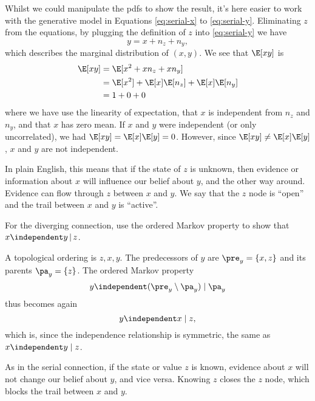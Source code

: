 \begin{exenumerate}
\begin{solution}
       Whilst we could manipulate the pdfs to show the result, it's
       here easier to work with the generative model in Equations
       \eqref{eq:serial-x} to \eqref{eq:serial-y}. Eliminating $z$
       from the equations, by plugging the definition of $z$ into
       \eqref{eq:serial-y} we have
       \begin{equation}
         y = x + n_z + n_y,
       \end{equation}
       which describes the marginal distribution of $(x, y)$. We see
       that $\E[xy]$ is
       \begin{align}
         \E[xy] & = \E[x^2 + xn_z + x n_y]\\
         & =  \E[x^2] + \E[x]\E[n_z] + \E[x]\E[n_y]\\
         & = 1 + 0 + 0
       \end{align}
       where we have use the linearity of expectation, that $x$ is
       independent from $n_z$ and $n_y$, and that $x$ has zero
       mean. If $x$ and $y$ were independent (or only uncorrelated),
       we had $\E[xy] = \E[x]\E[y] = 0$. However, since $\E[xy] \neq \E[x]
       \E[y]$, $x$ and $y$ are not independent.

       In plain English, this means that if the state of $z$ is
       unknown, then evidence or information about $x$ will influence
       our belief about $y$, and the other way around. Evidence can
       flow through $z$ between $x$ and $y$. We say that the $z$ node
       is ``open'' and the trail between $x$ and $y$ is ``active''.
       
     \end{solution}
 \item For the diverging connection, use the ordered Markov property
   to show that $x \independent y \,|\, z$.
    \begin{solution}
     A topological ordering is $z, x, y$. The predecessors of
     $y$ are $\pre_y = \{x, z\}$ and its parents $\pa_y = \{z\}$. The
     ordered Markov property
     \begin{equation}
       y \independent ( \pre_y \setminus \pa_y ) \mid \pa_y
     \end{equation}
     thus becomes again
     \begin{equation}
       y \independent x \mid z,
     \end{equation}
     which is, since the independence relationship is symmetric, the
     same as $x \independent y \mid z$.

     As in the serial connection, if the state or value $z$ is known,
     evidence about $x$ will not change our belief about $y$, and vice
     versa. Knowing $z$ closes the $z$ node, which blocks the trail
     between $x$ and $y$.
    \end{solution}


\end{exenumerate}
